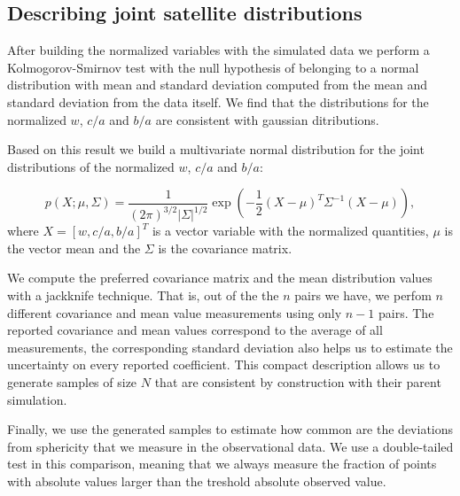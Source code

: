 \documentclass[a4paper,fleqn,usenatbib]{mnras}
\begin{document}
\subsection{Describing joint satellite distributions}

After building the normalized variables with the simulated data we
perform a Kolmogorov-Smirnov test with the null hypothesis of belonging
to a normal distribution with mean and standard deviation computed
from the mean and standard deviation from the data itself. 
We find that the distributions for the normalized $w$, $c/a$ and $b/a$
are consistent with gaussian ditributions.


Based on this result we build a multivariate normal distribution for
the joint distributions of the normalized $w$, $c/a$ and $b/a$:

\begin{equation}
p(X; \mu, \Sigma) = \frac{1}{(2\pi)^{3/2}|\Sigma|^{1/2}}
\exp\left(-\frac{1}{2}(X-\mu)^{T}\Sigma^{-1}(X-\mu)\right), 
\label{eq:multivariate}
\end{equation}
% 
where $X=[w, c/a, b/a]^{T}$ is a vector variable with the normalized
quantities, $\mu$ is the vector mean and the $\Sigma$ is the
covariance matrix.  

We compute the preferred covariance matrix and the mean distribution values
with a jackknife technique. 
That is, out of the the $n$ pairs we have, we perfom $n$ different
covariance and mean value measurements using only $n-1$ pairs. 
The reported covariance and mean values correspond to the average of
all measurements, the corresponding standard deviation also helps us to
estimate the uncertainty on every reported coefficient.
This compact description allows us to generate samples of size $N$
that are consistent by construction with their parent simulation. 

Finally, we use the generated samples to estimate how
common are the deviations from sphericity that we measure in the
observational data.  
We use a double-tailed test in this comparison, meaning that we
always measure the fraction of points with absolute values larger than the
treshold absolute observed value. 


\end{document}
